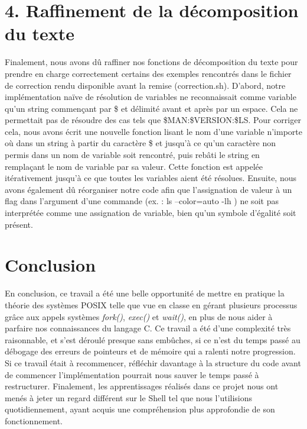 \documentclass{article}
\begin{document}
\section*{ 4. Raffinement de la décomposition du texte }
\setlength{\parindent}{20pt}
Finalement, nous avons dû raffiner nos fonctions de décomposition du texte pour prendre en charge correctement certains des exemples rencontrés dans le fichier de correction rendu disponible avant la remise (correction.sh). 
D’abord, notre implémentation naïve de résolution de variables ne reconnaissait comme variable qu’un string commençant par \$ et délimité avant et après par un espace. Cela ne permettait pas de résoudre des cas tels que \$MAN:\$VERSION:\$LS. Pour corriger cela, nous avons écrit une nouvelle fonction lisant le nom d’une variable n’importe où dans un string à partir du caractère \$ et jusqu’à ce qu’un caractère non permis dans un nom de variable soit rencontré, puis rebâti le string en remplaçant le nom de variable par sa valeur. Cette fonction est appelée itérativement jusqu’à ce que toutes les variables aient été résolues.
Ensuite, nous avons également dû réorganiser notre code afin que l’assignation de valeur à un flag dans l’argument d’une commande (ex. : ls --color=auto -lh ) ne soit pas interprétée comme une assignation de variable, bien qu’un symbole d'égalité soit présent. 

\section*{ Conclusion }
\setlength{\parindent}{20pt}
En conclusion, ce travail a été une belle opportunité de mettre en pratique la théorie des systèmes POSIX telle que vue en classe en gérant plusieurs processus grâce aux appels systèmes \emph{fork()}, \emph{exec()} et \emph{wait()}, en plus de nous aider à parfaire nos connaissances du langage C. Ce travail a été d’une complexité très raisonnable, et s’est déroulé presque sans embûches, si ce n’est du temps passé au débogage des erreurs de pointeurs et de mémoire qui a ralenti notre progression.  Si ce travail était à recommencer, réfléchir davantage à la structure du code avant de commencer l’implémentation pourrait nous sauver le temps passé à restructurer.  Finalement, les apprentissages réalisés dans ce projet nous ont menés à jeter un regard différent sur le Shell tel que nous l’utilisions quotidiennement, ayant acquis une compréhension plus approfondie de son fonctionnement.
\end{document}
